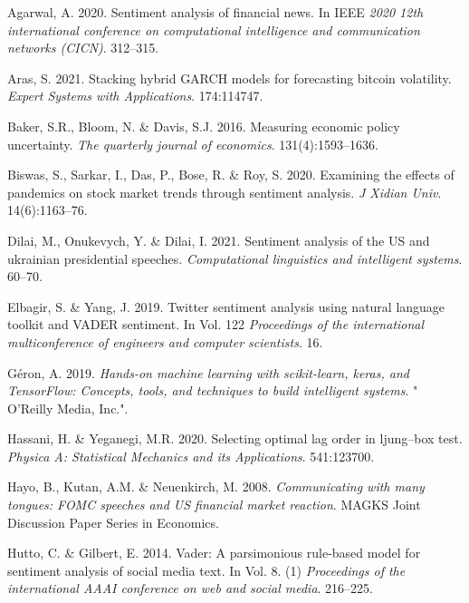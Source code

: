 \documentclass[11pt,preprint, authoryear]{elsarticle}
\numberwithin{equation}{section}
\numberwithin{figure}{section}
\numberwithin{table}{section}
\newlength{\cslhangindent}
\newenvironment{CSLReferences}%
  {\setlength{\parindent}{0pt}%
  \everypar{\setlength{\hangindent}{\cslhangindent}}\ignorespaces}%
  {\par}
\begin{document}
\hypertarget{refs}{}
\begin{CSLReferences}{1}{0}
\leavevmode{}%
Agarwal, A. 2020. Sentiment analysis of financial news. In IEEE
\emph{2020 12th international conference on computational intelligence
and communication networks (CICN)}. 312--315.

\leavevmode{}%
Aras, S. 2021. Stacking hybrid GARCH models for forecasting bitcoin
volatility. \emph{Expert Systems with Applications}. 174:114747.

\leavevmode{}%
Baker, S.R., Bloom, N. \& Davis, S.J. 2016. Measuring economic policy
uncertainty. \emph{The quarterly journal of economics}.
131(4):1593--1636.

\leavevmode{}%
Biswas, S., Sarkar, I., Das, P., Bose, R. \& Roy, S. 2020. Examining the
effects of pandemics on stock market trends through sentiment analysis.
\emph{J Xidian Univ}. 14(6):1163--76.

\leavevmode{}%
Dilai, M., Onukevych, Y. \& Dilai, I. 2021. Sentiment analysis of the US
and ukrainian presidential speeches. \emph{Computational linguistics and
intelligent systems}. 60--70.

\leavevmode{}%
Elbagir, S. \& Yang, J. 2019. Twitter sentiment analysis using natural
language toolkit and VADER sentiment. In Vol. 122 \emph{Proceedings of
the international multiconference of engineers and computer scientists}.
16.

\leavevmode{}%
Géron, A. 2019. \emph{Hands-on machine learning with scikit-learn,
keras, and TensorFlow: Concepts, tools, and techniques to build
intelligent systems}. " O'Reilly Media, Inc.".

\leavevmode{}%
Hassani, H. \& Yeganegi, M.R. 2020. Selecting optimal lag order in
ljung--box test. \emph{Physica A: Statistical Mechanics and its
Applications}. 541:123700.

\leavevmode{}%
Hayo, B., Kutan, A.M. \& Neuenkirch, M. 2008. \emph{Communicating with
many tongues: FOMC speeches and US financial market reaction}. MAGKS
Joint Discussion Paper Series in Economics.

\leavevmode{}%
Hutto, C. \& Gilbert, E. 2014. Vader: A parsimonious rule-based model
for sentiment analysis of social media text. In Vol. 8. (1)
\emph{Proceedings of the international AAAI conference on web and social
media}. 216--225.


\end{CSLReferences}
\end{document}
